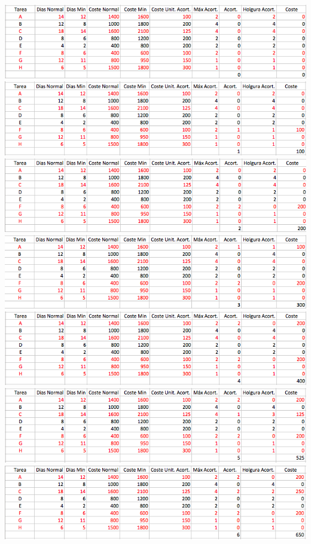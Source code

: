 \documentclass[10pt, a4paper,spanish]{article}
\begin{document}
	\noindent
	\includegraphics[width=\textwidth]{table-02}
	\includegraphics[width=\textwidth]{table-03}
	\includegraphics[width=\textwidth]{table-04}
	\includegraphics[width=\textwidth]{table-05}
	\includegraphics[width=\textwidth]{table-06}
	\includegraphics[width=\textwidth]{table-07}
	\includegraphics[width=\textwidth]{table-08}
\end{document}
